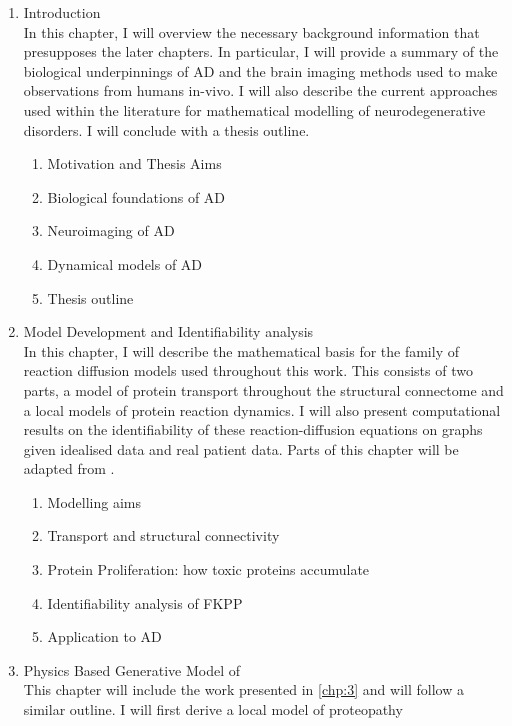 \begin{enumerate}
    \item Introduction \\
    In this chapter, I will overview the necessary background information that 
    presupposes the later chapters. In particular, I will provide a summary 
    of the biological underpinnings of AD and the brain imaging methods used 
    to make observations from humans in-vivo. I will also describe the current 
    approaches used within the literature for mathematical modelling of 
    neurodegenerative disorders. I will conclude with a thesis outline.
    \begin{enumerate}
        \item Motivation and Thesis Aims 
        \item Biological foundations of AD
        \item Neuroimaging of AD 
        \item Dynamical models of AD
        \item Thesis outline
    \end{enumerate}
    \item Model Development and Identifiability analysis \\ 
    In this chapter, I will describe the mathematical basis for the family of
    reaction diffusion models used throughout this work. This consists of two
    parts, a model of protein transport throughout the structural connectome and
    a local models of protein reaction dynamics. I will also present
    computational results on the identifiability of these reaction-diffusion
    equations on graphs given idealised data and real patient data. Parts of
    this chapter will be adapted from \cite{schafer2022correlating}.
    \begin{enumerate}
        \item Modelling aims
        \item Transport and structural connectivity
        \item Protein Proliferation: how toxic proteins accumulate
        \item Identifiability analysis of FKPP
        \item Application to AD
    \end{enumerate}
    \item Physics Based Generative Model of \TP \\
    This chapter will include the work presented in \cref{chp:3} and will follow
    a similar outline. I will first derive a local model of \TP proteopathy

\end{enumerate}
